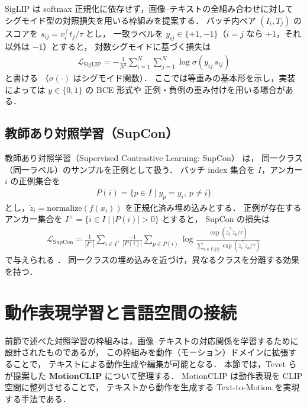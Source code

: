 SigLIP \cite{siglip} は softmax 正規化に依存せず，画像--テキストの全組み合わせに対して
シグモイド型の対照損失を用いる枠組みを提案する．
バッチ内ペア $(I_i,T_j)$ のスコアを $s_{ij}=v_i^\top t_j/\tau$ とし，
一致ラベルを $y_{ij}\in\{+1,-1\}$（$i=j$ なら $+1$，それ以外は $-1$）とすると，
対数シグモイドに基づく損失は
\begin{align}
  \mathcal{L}_{\mathrm{SigLIP}}
  = -\frac{1}{N^2}\sum_{i=1}^{N}\sum_{j=1}^{N}\log \sigma\!\left(y_{ij}\, s_{ij}\right)
  \label{eq:siglip_loss}
\end{align}
と書ける \cite{siglip}（$\sigma(\cdot)$ はシグモイド関数）．
ここでは等重みの基本形を示し，実装によっては $y\in\{0,1\}$ の BCE 形式や
正例・負例の重み付けを用いる場合がある．

\subsection{教師あり対照学習（SupCon）}
\label{subsec:SupCon}

教師あり対照学習（Supervised Contrastive Learning: SupCon）\cite{supcon} は，
同一クラス（同一ラベル）のサンプルを正例として扱う．
バッチ index 集合を $I$，アンカー $i$ の正例集合を
\begin{align}
  P(i)=\{p\in I\mid y_p=y_i,\ p\neq i\}
\end{align}
とし，$\tilde{z}_i=\mathrm{normalize}(f(x_i))$ を正規化済み埋め込みとする．
正例が存在するアンカー集合を $I^+=\{i\in I\mid |P(i)|>0\}$ とすると，
SupCon の損失は
\begin{align}
  \mathcal{L}_{\mathrm{SupCon}}
  = \frac{1}{|I^+|}\sum_{i \in I^+}\frac{-1}{|P(i)|}\sum_{p\in P(i)}
  \log \frac{\exp(\tilde{z}_i^\top \tilde{z}_p/\tau)}{\sum_{a\in I\setminus\{i\}}\exp(\tilde{z}_i^\top \tilde{z}_a/\tau)}
  \label{eq:supcon_loss}
\end{align}
で与えられる \cite{supcon}．
同一クラスの埋め込みを近づけ，異なるクラスを分離する効果を持つ．


\section{動作表現学習と言語空間の接続}
\label{sec:motion_language_alignment}

前節で述べた対照学習の枠組みは，画像--テキストの対応関係を学習するために設計されたものであるが，
この枠組みを動作（モーション）ドメインに拡張することで，
テキストによる動作生成や編集が可能となる．
本節では，Tevet ら \cite{MotionCLIP} が提案した \textbf{MotionCLIP} について整理する．
MotionCLIP は動作表現を CLIP 空間に整列させることで，
テキストから動作を生成する Text-to-Motion を実現する手法である．

